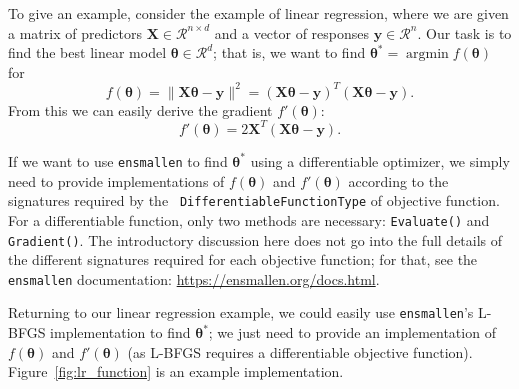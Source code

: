 To give an example, consider the example of linear regression, where we are
given a matrix of predictors $\bm X \in \mathcal{R}^{n \times d}$ and a vector
of responses $\bm y \in \mathcal{R}^n$.  Our task is to find the best linear
model $\bm \theta \in \mathcal{R}^d$; that is, we want to find $\bm \theta^* =
\operatorname{argmin} f(\bm \theta)$ for
\begin{equation}
f(\bm \theta) = \| \bm X \bm \theta - \bm y \|^2 = (\bm X \bm \theta - \bm y)^T
(\bm X \bm \theta - \bm y).
\label{eqn:obj_lr}
\end{equation}
From this we can easily derive the gradient $f'(\bm \theta)$:
\begin{equation}
f'(\bm \theta) = 2 \bm X^T (\bm X \bm \theta - \bm y).
\label{eqn:grad_lr}
\end{equation}

If we want to use {\tt ensmallen} to find $\bm \theta^*$ using a differentiable
optimizer, we simply need to provide implementations of $f(\bm \theta)$ and
$f'(\bm \theta)$ according to the signatures required by the {\tt
DifferentiableFunctionType} of objective function.  For a differentiable
function, only two methods are necessary: {\tt Evaluate()} and {\tt Gradient()}.
The introductory discussion here does not go into the full details of the
different signatures required for each objective function; for that, see the
{\tt ensmallen} documentation: \url{https://ensmallen.org/docs.html}.

Returning to our linear regression example, we could easily use {\tt ensmallen}'s
L-BFGS implementation to find $\bm \theta^*$; we just need to provide an
implementation of $f(\bm \theta)$ and $f'(\bm \theta)$ (as L-BFGS requires a
differentiable objective function).  Figure~\ref{fig:lr_function} is an example
implementation.

